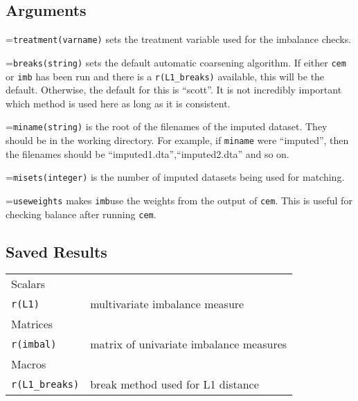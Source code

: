\documentclass[11pt,titlepage]{article}
\begin{document}
\subsection{Arguments}
\hangindent=\parindent{}\noindent\texttt{treatment(varname)} sets the treatment variable used for
  the imbalance checks.
  
  \hangindent=\parindent{}\noindent\texttt{breaks(string)} sets the default automatic coarsening
  algorithm. If either \texttt{cem} or \texttt{imb} has been run and
  there is a \texttt{r(L1\_breaks)} available, this will be the default.
  Otherwise, the default for this is ``scott''. It is not incredibly
  important which method is used here as long as it is consistent.
  
\hangindent=\parindent{}\noindent\texttt{miname(string)} is the root of the filenames of the imputed
  dataset. They should be in the working directory. For example, if
  \texttt{miname} were ``imputed'', then the filenames should be
  ``imputed1.dta'',``imputed2.dta'' and so on.
  
\hangindent=\parindent{}\noindent\texttt{misets(integer)} is the number of imputed datasets being
  used for matching.

\hangindent=\parindent{}\noindent\texttt{useweights} makes \texttt{imb}use the weights from the output of \texttt{cem}. This is useful for checking balance after running \texttt{cem}.

\subsection{Saved Results}
\begin{tabular}{ll}
Scalars&\\
\texttt{r(L1)} & multivariate imbalance measure\\
Matrices &\\
\texttt{r(imbal)} & matrix of univariate imbalance measures\\
Macros &\\
\texttt{r(L1\_breaks)}& break method used for L1 distance

\end{tabular}

 
\bibsep=0in 

\end{document}

